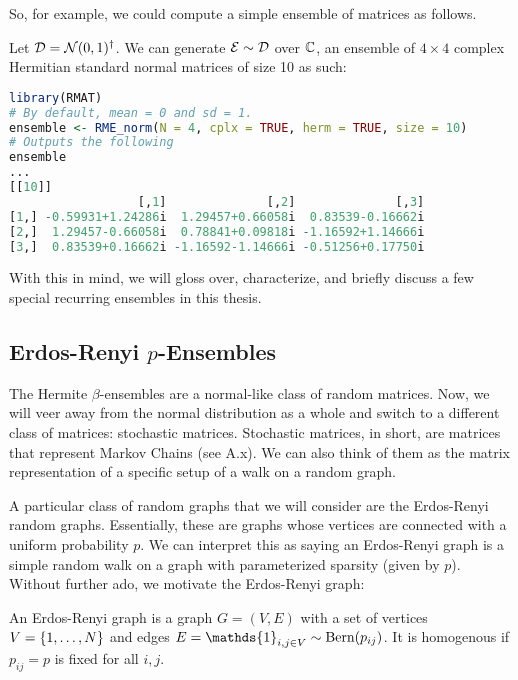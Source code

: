 \medskip
\noindent So, for example, we could compute a simple ensemble of matrices as follows.
\begin{code}
Let $\mathcal{D} = \Normal(0,1)^{\dagger}$. We can generate $\Ens \sim \D$ over $\Cc$, an ensemble of $4 \times 4$ complex Hermitian standard normal matrices of size 10 as such:
\end{code}

\begin{lstlisting}[language=R]
library(RMAT)
# By default, mean = 0 and sd = 1.
ensemble <- RME_norm(N = 4, cplx = TRUE, herm = TRUE, size = 10)
# Outputs the following
ensemble
...
[[10]]
                  [,1]              [,2]              [,3]
[1,] -0.59931+1.24286i  1.29457+0.66058i  0.83539-0.16662i
[2,]  1.29457-0.66058i  0.78841+0.09818i -1.16592+1.14666i
[3,]  0.83539+0.16662i -1.16592-1.14666i -0.51256+0.17750i
\end{lstlisting}

With this in mind, we will gloss over, characterize, and briefly discuss a few special recurring ensembles in this thesis.


\subsection{Erdos-Renyi $p$-Ensembles}

The Hermite $\beta$-ensembles are a normal-like class of random matrices. Now, we will veer away from the normal distribution as a whole and switch to a different class of matrices: stochastic matrices. Stochastic matrices, in short, are matrices that represent Markov Chains (see A.x). We can also think of them as the matrix representation of a specific setup of a walk on a random graph.

A particular class of random graphs that we will consider are the Erdos-Renyi random graphs. Essentially, these are graphs whose vertices are connected with a uniform probability $p$. We can interpret this as saying an Erdos-Renyi graph is a simple random walk on a graph with parameterized sparsity (given by $p$). Without further ado, we motivate the Erdos-Renyi graph:

\begin{definition}
An Erdos-Renyi graph is a graph $G = (V,E)$ with a set of vertices $V = \{\oneto[N]\}$ and edges $E = \mathds{1}_{i,j \in V} \sim \Bern(p_{ij})$. It is homogenous if $p_{ij} = p$ is fixed for all $i, j$.
\end{definition}

